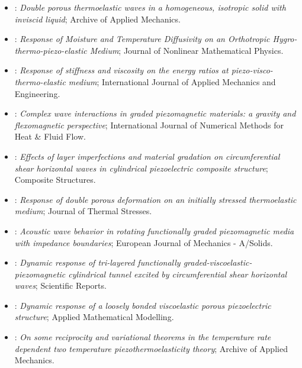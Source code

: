 \begin{itemize}
\item \citet{Pathania2023}: \emph{Double porous thermoelastic waves in a homogeneous, isotropic solid with inviscid liquid}; Archive of Applied Mechanics.
\item \citet{Gupta2024c}: \emph{Response of Moisture and Temperature Diffusivity on an Orthotropic Hygro-thermo-piezo-elastic Medium}; Journal of Nonlinear Mathematical Physics.
\item \citet{Kumar2024a}: \emph{Response of stiffness and viscosity on the energy ratios at piezo-visco-thermo-elastic medium}; International Journal of Applied Mechanics and Engineering.
\item \citet{Guha2025}: \emph{Complex wave interactions in graded piezomagnetic materials: a gravity and flexomagnetic perspective}; International Journal of Numerical Methods for Heat \& Fluid Flow.
\item \citet{Gupta2025}: \emph{Effects of layer imperfections and material gradation on circumferential shear horizontal waves in cylindrical piezoelectric composite structure}; Composite Structures.
\item \citet{Kumar2025a}: \emph{Response of double porous deformation on an initially stressed thermoelastic medium}; Journal of Thermal Stresses.
\item \citet{Guha2026}: \emph{Acoustic wave behavior in rotating functionally graded piezomagnetic media with impedance boundaries}; European Journal of Mechanics - A/Solids.
\item \citet{Gupta2026a}: \emph{Dynamic response of tri-layered functionally graded-viscoelastic-piezomagnetic cylindrical tunnel excited by circumferential shear horizontal waves}; Scientific Reports.
\item \citet{Meghana2026}: \emph{Dynamic response of a loosely bonded viscoelastic porous piezoelectric structure}; Applied Mathematical Modelling.
\item \citet{Srivastava2026}: \emph{On some reciprocity and variational theorems in the temperature rate dependent two temperature piezothermoelasticity theory}; Archive of Applied Mechanics.
\end{itemize}
